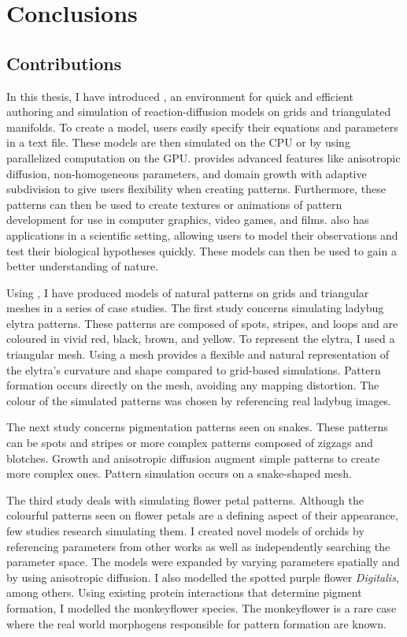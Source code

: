 \chapter{Conclusions}
\section{Contributions}
In this thesis, I have introduced \ProgramName{}, an environment for quick and efficient authoring and simulation of reaction-diffusion models on grids and triangulated manifolds. To create a model, users easily specify their equations and parameters in a text file. These models are then simulated on the CPU or by using parallelized computation on the GPU. \ProgramName{} provides advanced features like anisotropic diffusion, non-homogeneous parameters, and domain growth with adaptive subdivision to give users flexibility when creating patterns. Furthermore, these patterns can then be used to create textures or animations of pattern development for use in computer graphics, video games, and films. \ProgramName{} also has applications in a scientific setting, allowing users to model their observations and test their biological hypotheses quickly. These models can then be used to gain a better understanding of nature.

Using \ProgramName{}, I have produced models of natural patterns on grids and triangular meshes in a series of case studies. The first study concerns simulating ladybug elytra patterns. These patterns are composed of spots, stripes, and loops and are coloured in vivid red, black, brown, and yellow. To represent the elytra, I used a triangular mesh. Using a mesh provides a flexible and natural representation of the elytra's curvature and shape compared to grid-based simulations. Pattern formation occurs directly on the mesh, avoiding any mapping distortion. The colour of the simulated patterns was chosen by referencing real ladybug images.

The next study concerns pigmentation patterns seen on snakes. These patterns can be spots and stripes or more complex patterns composed of zigzags and blotches. Growth and anisotropic diffusion augment simple patterns to create more complex ones. Pattern simulation occurs on a snake-shaped mesh.

The third study deals with simulating flower petal patterns. Although the colourful patterns seen on flower petals are a defining aspect of their appearance, few studies research simulating them. I created novel models of orchids by referencing parameters from other works as well as independently searching the parameter space. The models were expanded by varying parameters spatially and by using anisotropic diffusion. I also modelled the spotted purple flower \textit{Digitalis}, among others. Using existing protein interactions that determine pigment formation, I modelled the monkeyflower species. The monkeyflower is a rare case where the real world morphogens responsible for pattern formation are known.

